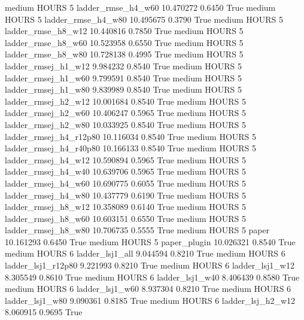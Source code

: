     medium    HOURS                 5     ladder_rmse_h4_w60  10.470272      0.6450    True
    medium    HOURS                 5     ladder_rmse_h4_w80  10.495675      0.3790    True
    medium    HOURS                 5     ladder_rmse_h8_w12  10.440816      0.7850    True
    medium    HOURS                 5     ladder_rmse_h8_w60  10.523958      0.6550    True
    medium    HOURS                 5     ladder_rmse_h8_w80  10.728138      0.4995    True
    medium    HOURS                 5    ladder_rmsej_h1_w12   9.984232      0.8540    True
    medium    HOURS                 5    ladder_rmsej_h1_w60   9.799591      0.8540    True
    medium    HOURS                 5    ladder_rmsej_h1_w80   9.839989      0.8540    True
    medium    HOURS                 5    ladder_rmsej_h2_w12  10.001684      0.8540    True
    medium    HOURS                 5    ladder_rmsej_h2_w60  10.406247      0.5965    True
    medium    HOURS                 5    ladder_rmsej_h2_w80  10.033925      0.8540    True
    medium    HOURS                 5 ladder_rmsej_h4_r12p80  10.116034      0.8540    True
    medium    HOURS                 5 ladder_rmsej_h4_r40p80  10.166133      0.8540    True
    medium    HOURS                 5    ladder_rmsej_h4_w12  10.590894      0.5965    True
    medium    HOURS                 5    ladder_rmsej_h4_w40  10.639706      0.5965    True
    medium    HOURS                 5    ladder_rmsej_h4_w60  10.690775      0.6055    True
    medium    HOURS                 5    ladder_rmsej_h4_w80  10.437779      0.6190    True
    medium    HOURS                 5    ladder_rmsej_h8_w12  10.358089      0.6140    True
    medium    HOURS                 5    ladder_rmsej_h8_w60  10.603151      0.6550    True
    medium    HOURS                 5    ladder_rmsej_h8_w80  10.706735      0.5555    True
    medium    HOURS                 5                  paper  10.161293      0.6450    True
    medium    HOURS                 5           paper_plugin  10.026321      0.8540    True
    medium    HOURS                 6        ladder_lsj1_all   9.044594      0.8210    True
    medium    HOURS                 6     ladder_lsj1_r12p80   9.221993      0.8210    True
    medium    HOURS                 6        ladder_lsj1_w12   8.305549      0.8610    True
    medium    HOURS                 6        ladder_lsj1_w40   8.406439      0.8580    True
    medium    HOURS                 6        ladder_lsj1_w60   8.937304      0.8210    True
    medium    HOURS                 6        ladder_lsj1_w80   9.090361      0.8185    True
    medium    HOURS                 6      ladder_lsj_h2_w12   8.060915      0.9695    True
